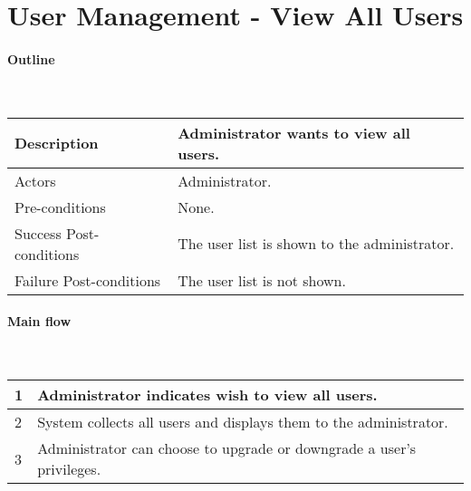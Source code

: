\section*{User Management - View All Users} %

\paragraph*{Outline} \

\begin{tabular}{ | l | l | }
\hline
Description & Administrator wants to view all users. \\ \hline
Actors & Administrator. \\ \hline
Pre-conditions & None. \\ \hline
Success Post-conditions & The user list is shown to the administrator. \\ \hline
Failure Post-conditions & The user list is not shown. \\ \hline
\end{tabular}


\paragraph*{Main flow} \

\begin{tabular}{ | l | l | } \hline
1 & Administrator indicates wish to view all users. \\ \hline
2 & System collects all users and displays them to the administrator. \\ \hline
3 & Administrator can choose to upgrade or downgrade a user's privileges. \\ \hline
\end{tabular}